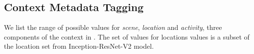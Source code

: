 \subsection{Context Metadata Tagging}
\label{sec:tag}

We list the range of possible values for {\em scene}, {\em location}
and {\em activity}, three components of the context in . The set of values for locations values is a subset of the location set from Inception-ResNet-V2 model. 


